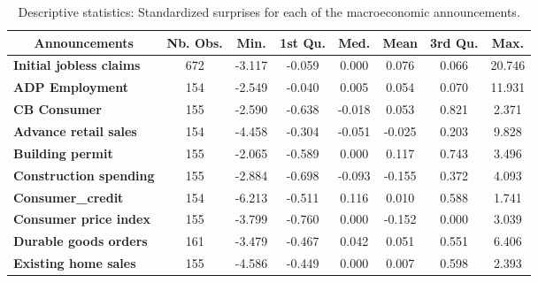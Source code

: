 \begin{landscape}
\begin{table}[]
\begin{center}
\caption{Descriptive statistics: Standardized surprises for each of the macroeconomic announcements.}
\label{tab:stat2}
\begin{tabular}{@{}lccccccc@{}}
\toprule
\multicolumn{1}{c}{\textbf{Announcements}} & \textbf{Nb. Obs.} & \textbf{Min.} & \textbf{1st Qu.} & \textbf{Med.} & \textbf{Mean} & \textbf{3rd Qu.} & \textbf{Max.} \\ \midrule
\textbf{Initial jobless claims}            & 672                      & -3.117        & -0.059           & 0.000           & 0.076         & 0.066            & 20.746        \\
\textbf{ADP Employment}                    & 154                      & -2.549        & -0.040           & 0.005           & 0.054         & 0.070            & 11.931        \\
\textbf{CB Consumer}                       & 155                      & -2.590        & -0.638           & -0.018          & 0.053         & 0.821            & 2.371         \\
\textbf{Advance retail sales}              & 154                      & -4.458        & -0.304           & -0.051          & -0.025        & 0.203            & 9.828         \\
\textbf{Building permit}                   & 155                      & -2.065        & -0.589           & 0.000           & 0.117         & 0.743            & 3.496         \\
\textbf{Construction spending}             & 155                      & -2.884        & -0.698           & -0.093          & -0.155        & 0.372            & 4.093         \\
\textbf{Consumer\_credit}                  & 154                      & -6.213        & -0.511           & 0.116           & 0.010         & 0.588            & 1.741         \\
\textbf{Consumer price index}              & 155                      & -3.799        & -0.760           & 0.000           & -0.152        & 0.000            & 3.039         \\
\textbf{Durable goods orders}              & 161                      & -3.479        & -0.467           & 0.042           & 0.051         & 0.551            & 6.406         \\
\textbf{Existing home sales}               & 155                      & -4.586        & -0.449           & 0.000           & 0.007         & 0.598            & 2.393         \\

\end{tabular}
\end{center}
\end{table}
\end{landscape}
